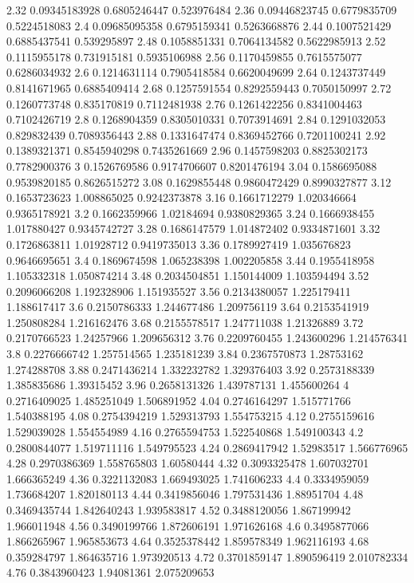 {2.32 0.09345183928 0.6805246447 0.523976484
2.36 0.09446823745 0.6779835709 0.5224518083
2.4 0.09685095358 0.6795159341 0.5263668876
2.44 0.1007521429 0.6885437541 0.539295897
2.48 0.1058851331 0.7064134582 0.5622985913
2.52 0.1115955178 0.731915181 0.5935106988
2.56 0.1170459855 0.7615575077 0.6286034932
2.6 0.1214631114 0.7905418584 0.6620049699
2.64 0.1243737449 0.8141671965 0.6885409414
2.68 0.1257591554 0.8292559443 0.7050150997
2.72 0.1260773748 0.835170819 0.7112481938
2.76 0.1261422256 0.8341004463 0.7102426719
2.8 0.1268904359 0.8305010331 0.7073914691
2.84 0.1291032053 0.829832439 0.7089356443
2.88 0.1331647474 0.8369452766 0.7201100241
2.92 0.1389321371 0.8545940298 0.7435261669
2.96 0.1457598203 0.8825302173 0.7782900376
3 0.1526769586 0.9174706607 0.8201476194
3.04 0.1586695088 0.9539820185 0.8626515272
3.08 0.1629855448 0.9860472429 0.8990327877
3.12 0.1653723623 1.008865025 0.9242373878
3.16 0.1661712279 1.020346664 0.9365178921
3.2 0.1662359966 1.02184694 0.9380829365
3.24 0.1666938455 1.017880427 0.9345742727
3.28 0.1686147579 1.014872402 0.9334871601
3.32 0.1726863811 1.01928712 0.9419735013
3.36 0.1789927419 1.035676823 0.9646695651
3.4 0.1869674598 1.065238398 1.002205858
3.44 0.1955418958 1.105332318 1.050874214
3.48 0.2034504851 1.150144009 1.103594494
3.52 0.2096066208 1.192328906 1.151935527
3.56 0.2134380057 1.225179411 1.188617417
3.6 0.2150786333 1.244677486 1.209756119
3.64 0.2153541919 1.250808284 1.216162476
3.68 0.2155578517 1.247711038 1.21326889
3.72 0.2170766523 1.24257966 1.209656312
3.76 0.2209760455 1.243600296 1.214576341
3.8 0.2276666742 1.257514565 1.235181239
3.84 0.2367570873 1.28753162 1.274288708
3.88 0.2471436214 1.332232782 1.329376403
3.92 0.2573188339 1.385835686 1.39315452
3.96 0.2658131326 1.439787131 1.455600264
4 0.2716409025 1.485251049 1.506891952
4.04 0.2746164297 1.515771766 1.540388195
4.08 0.2754394219 1.529313793 1.554753215
4.12 0.2755159616 1.529039028 1.554554989
4.16 0.2765594753 1.522540868 1.549100343
4.2 0.2800844077 1.519711116 1.549795523
4.24 0.2869417942 1.52983517 1.566776965
4.28 0.2970386369 1.558765803 1.60580444
4.32 0.3093325478 1.607032701 1.666365249
4.36 0.3221132083 1.669493025 1.741606233
4.4 0.3334959059 1.736684207 1.820180113
4.44 0.3419856046 1.797531436 1.88951704
4.48 0.3469435744 1.842640243 1.939583817
4.52 0.3488120056 1.867199942 1.966011948
4.56 0.3490199766 1.872606191 1.971626168
4.6 0.3495877066 1.866265967 1.965853673
4.64 0.3525378442 1.859578349 1.962116193
4.68 0.359284797 1.864635716 1.973920513
4.72 0.3701859147 1.890596419 2.010782334
4.76 0.3843960423 1.94081361 2.075209653
}
